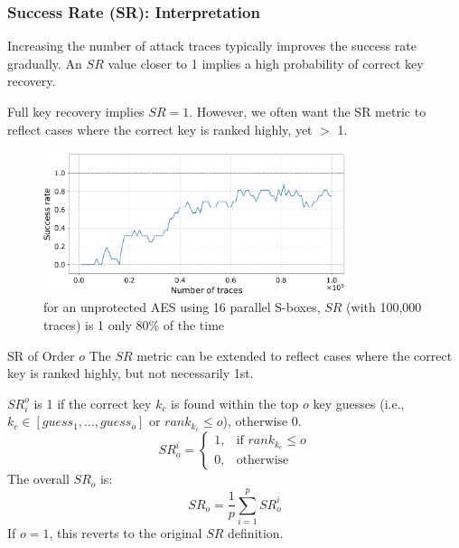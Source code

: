 \begin{frame}
    \frametitle{Success Rate (SR): Interpretation}
    Increasing the number of attack traces typically improves the success rate gradually.
    An $SR$ value closer to 1 implies a high probability of correct key recovery. \newline %

    Full key recovery implies $SR=1$. However, we often want the SR metric to reflect cases where the correct key is ranked highly, yet $>$ 1. 
    \newline

    \begin{figure}[htbp]
        \centering
        \includegraphics[width=0.8\textwidth]{metrics/Pictures/SR_plot_unprotected.png}
        \caption{for an unprotected AES using 16 parallel S-boxes, $SR$ (with 100,000 traces) is 1 only 80\% of the time}
    \end{figure}
\end{frame}
\begin{frame}
    \begin{block}{SR of Order $o$}
        The $SR$ metric can be extended to reflect cases where the correct key is ranked highly, but not necessarily 1st.
        
        $SR_i^o$ is 1 if the correct key $k_c$ is found within the top $o$ key guesses (i.e., $k_c \in [guess_1, \dots, guess_o]$ or $rank_{k_c} \le o$), otherwise 0.
        $$ SR_o^i = \begin{cases} 1, & \text{if } rank_{k_c} \le o \\ 0, & \text{otherwise} \end{cases} $$
        The overall $SR_o$ is:
        $$ SR_o = \frac{1}{p} \sum_{i=1}^{p} SR_o^i $$
        If $o=1$, this reverts to the original $SR$ definition.
    \end{block}
\end{frame}



